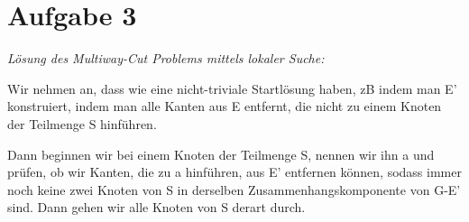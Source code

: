 \documentclass{article}
\begin{document}
\section*{Aufgabe 3}

\textit{Lösung des Multiway-Cut Problems mittels lokaler Suche:}

Wir nehmen an, dass wie eine nicht-triviale Startlösung haben, zB indem 
man E' konstruiert, indem man alle Kanten aus E entfernt, die nicht zu 
einem Knoten der Teilmenge S hinführen.

Dann beginnen wir bei einem Knoten der Teilmenge S, nennen wir ihn a und 
prüfen, ob wir Kanten, die zu a hinführen, aus E' entfernen können, 
sodass immer noch keine zwei Knoten von S in derselben 
Zusammenhangskomponente von G-E' sind. 
Dann gehen wir alle Knoten von S derart durch.
 
\end{document}
